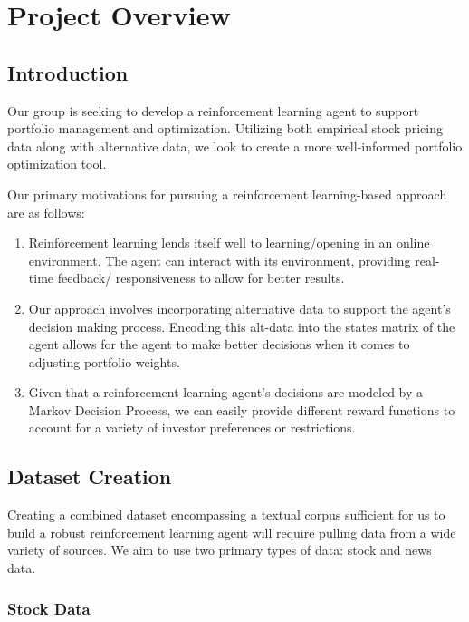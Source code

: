 \chapter{Project Overview}

\section{Introduction}

Our group is seeking to develop a reinforcement learning agent to support portfolio 
management and optimization. Utilizing both empirical stock pricing data along with 
alternative data, we look to create a more well-informed portfolio optimization tool. 

Our primary motivations for pursuing a reinforcement learning-based approach are as 
follows:

\begin{enumerate}
    \item Reinforcement learning lends itself well to learning/opening in an online environment. The agent can interact with its environment, providing real-time feedback/ responsiveness to allow for better results.
    \item Our approach involves incorporating alternative data to support the agent’s decision making process. Encoding this alt-data into the states matrix of the agent allows for the agent to make better decisions when it comes to adjusting portfolio weights.
    \item Given that a reinforcement learning agent’s decisions are modeled by a Markov Decision Process, we can easily provide different reward functions to account for a variety of investor preferences or restrictions.
\end{enumerate}



\section{Dataset Creation}

Creating a combined dataset encompassing a textual corpus sufficient for us to build 
a robust reinforcement learning agent will require pulling data from a wide variety 
of sources. We aim to use two primary types of data: stock and news data.

\subsection{Stock Data}

